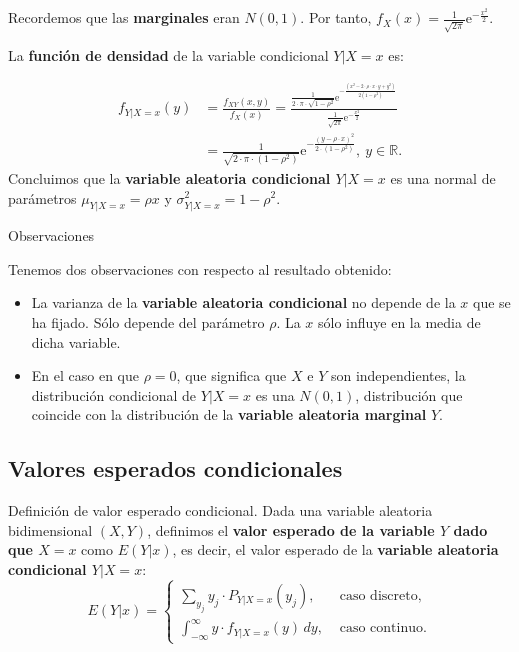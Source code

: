 \documentclass[]{book}
\begin{document}
Recordemos que las \textbf{marginales} eran \(N(0,1)\). Por tanto, \(f_X(x)=\frac{1}{\sqrt{2\pi}}\mathrm{e}^{-\frac{x^2}{2}}.\)

La \textbf{función de densidad} de la variable condicional \(Y|X=x\) es:

\[
\begin{array}{rl}
f_{Y|X=x}(y) & =  \frac{f_{XY}(x,y)}{f_X(x)}=\frac{\frac{1}{2\cdot \pi\cdot \sqrt{1-\rho^2}}\mathrm{e}^{-\frac{(x^2-2\cdot \rho \cdot x\cdot y+y^2)}{2(1-\rho^2)}}}{\frac{1}{\sqrt{2\pi}}\mathrm{e}^{-\frac{x^2}{2}}}\\
& =\frac{1}{\sqrt{2\cdot \pi\cdot  (1-\rho^2)}}\mathrm{e}^{-\frac{(y-\rho\cdot  x)^2}{2\cdot (1-\rho^2)}},\ y\in\mathbb{R}.
\end{array}
\]
Concluimos que la \textbf{variable aleatoria condicional \(Y|X=x\)} es una normal de parámetros \(\mu_{Y|X=x}=\rho x\) y \(\sigma_{Y|X=x}^2 =1-\rho^2\).

 Observaciones

Tenemos dos observaciones con respecto al resultado obtenido:

\begin{itemize}
\item
  La varianza de la \textbf{variable aleatoria condicional} no depende de la \(x\) que se ha fijado. Sólo depende del parámetro \(\rho\). La \(x\) sólo influye en la media de dicha variable.
\item
  En el caso en que \(\rho=0\), que significa que \(X\) e \(Y\) son independientes, la distribución condicional de \(Y|X=x\) es una \(N(0,1)\), distribución que coincide con la distribución de la \textbf{variable aleatoria marginal} \(Y\).
\end{itemize}

\hypertarget{valores-esperados-condicionales}{%
\subsection{Valores esperados condicionales}\label{valores-esperados-condicionales}}

Definición de valor esperado condicional.
Dada una variable aleatoria bidimensional \((X,Y)\), definimos el \textbf{valor esperado de la variable \(Y\) dado que \(X=x\)} como \(E(Y|x)\), es decir, el valor esperado de la \textbf{variable aleatoria condicional \(Y|X=x\)}:
\[
E(Y|x)=\begin{cases}
\displaystyle\sum_{y_j} y_j \cdot P_{Y|X=x}(y_j), & \mbox{ caso discreto,}\\
\displaystyle\int_{-\infty}^\infty y \cdot f_{Y|X=x}(y)\,dy, & \mbox{ caso continuo.}
\end{cases}
\]
\end{document}
